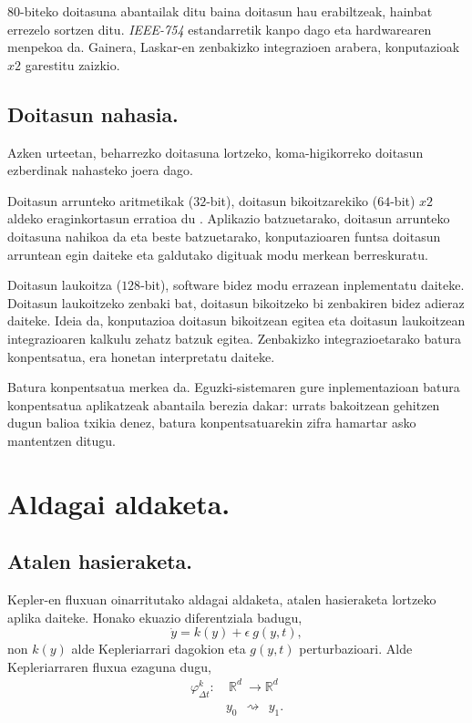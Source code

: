 $80$-biteko doitasuna abantailak ditu baina doitasun hau erabiltzeak, hainbat errezelo sortzen ditu. 
 \emph{IEEE-754} estandarretik kanpo dago eta hardwarearen menpekoa da. Gainera, Laskar-en \cite{Laskar2011} zenbakizko integrazioen arabera, konputazioak $x2$ garestitu zaizkio. 


\subsection*{Doitasun nahasia.}


Azken urteetan, beharrezko doitasuna lortzeko, koma-higikorreko doitasun ezberdinak nahasteko joera dago. 

Doitasun arrunteko aritmetikak ($32$-bit), doitasun bikoitzarekiko ($64$-bit) $x2$ aldeko eraginkortasun erratioa  du \cite{Dongarra2017}. Aplikazio batzuetarako, doitasun arrunteko doitasuna nahikoa da eta beste batzuetarako, konputazioaren funtsa doitasun arruntean egin daiteke eta galdutako digituak modu merkean berreskuratu.

Doitasun laukoitza ($128$-bit), software bidez modu errazean  inplementatu daiteke. Doitasun laukoitzeko zenbaki bat, doitasun bikoitzeko bi zenbakiren bidez adieraz daiteke. Ideia da, konputazioa doitasun bikoitzean egitea eta doitasun laukoitzean integrazioaren kalkulu zehatz batzuk egitea. Zenbakizko integrazioetarako batura konpentsatua, era honetan interpretatu daiteke. 

Batura konpentsatua merkea da. Eguzki-sistemaren gure inplementazioan batura konpentsatua aplikatzeak abantaila berezia dakar: urrats bakoitzean gehitzen dugun balioa txikia denez, batura konpentsatuarekin zifra hamartar asko mantentzen ditugu.            


\section{Aldagai aldaketa.}


\subsection*{Atalen hasieraketa.}
Kepler-en fluxuan oinarritutako aldagai aldaketa, atalen hasieraketa lortzeko aplika daiteke. Honako ekuazio diferentziala badugu,
\begin{equation*}
\dot{y}=k(y)+\epsilon \ g(y,t),
\end{equation*}
non $k(y)$ alde Kepleriarrari dagokion eta $g(y,t)$ perturbazioari. Alde Kepleriarraren fluxua ezaguna dugu,
\begin{align*}
\varphi_{\Delta t}^k:&  \ \mathbb{R}^d \ \longrightarrow \mathbb{R}^d  \\
&  y_0 \ \ \rightsquigarrow \ \ y_1. 
\end{align*}

